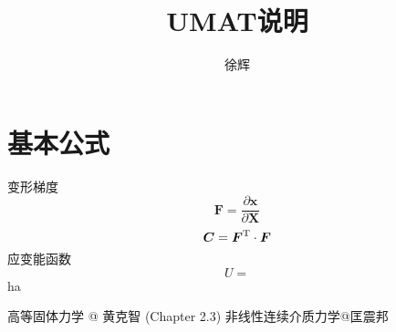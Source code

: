 \documentclass{article}
\title{UMAT说明}
\author{徐辉}
\begin{document}
\maketitle
\section{基本公式}
变形梯度
$$\bm{F}=\frac{\partial \bm{x}}{ \partial \bm{X}}$$
$$\bm{C}=\bm{F}^{\rm T}\cdot \bm{F}$$
应变能函数
$$U=$$ha 
\begin{thebibliography}{1}
     高等固体力学 @ 黄克智 (Chapter 2.3)
     非线性连续介质力学@匡震邦
\end{thebibliography}
\end{document}
